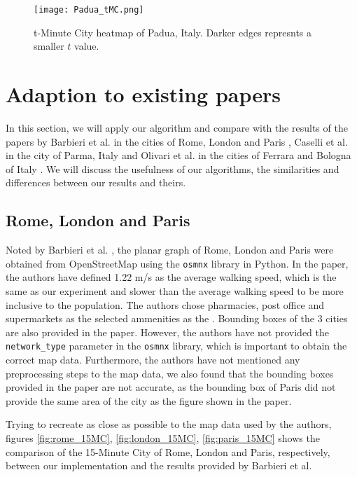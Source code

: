 \begin{figure}[htbp]
    \centering
    \texttt{[image: Padua\_tMC.png]}
    \caption{t-Minute City heatmap of Padua, Italy. Darker edges represnts a smaller $t$ value.}
    \label{fig:padua_tMC}
\end{figure}

\section{Adaption to existing papers}

In this section, we will apply our algorithm and compare with the results of the papers by Barbieri et al. in the cities of Rome, London and Paris \cite{barbieri_graph_2023}, Caselli et al. in the city of Parma, Italy \cite{caselli_exploring_2022} and Olivari et al. in the cities of Ferrara and Bologna of Italy \cite{olivari_are_2023}. We will discuss the usefulness of our algorithms, the similarities and differences between our results and theirs.

\subsection{Rome, London and Paris}

Noted by Barbieri et al. \cite{barbieri_graph_2023}, the planar graph of Rome, London and Paris were obtained from OpenStreetMap using the \verb|osmnx| library in Python. In the paper, the authors have defined 1.22 m/s as the average walking speed, which is the same as our experiment and slower than the average walking speed to be more inclusive to the population. The authors chose pharmacies, post office and supermarkets as the selected ammenities as the . Bounding boxes of the 3 cities are also provided in the paper. However, the authors have not provided the \verb|network_type| parameter in the \verb|osmnx| library, which is important to obtain the correct map data. Furthermore, the authors have not mentioned any preprocessing steps to the map data, we also found that the bounding boxes provided in the paper are not accurate, as the bounding box of Paris did not provide the same area of the city as the figure shown in the paper.

Trying to recreate as close as possible to the map data used by the authors, figures \ref{fig:rome_15MC}, \ref{fig:london_15MC}, \ref{fig:paris_15MC} shows the comparison of the 15-Minute City of Rome, London and Paris, respectively, between our implementation and the results provided by Barbieri et al.

